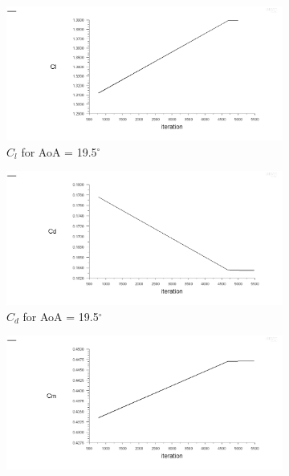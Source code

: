 \begin{figure}[H]
  \begin{subfigure}[b]{0.5\textwidth}
    \includegraphics[width=\textwidth]{19.5_deg/AoA_19_5_cl.png}
    \caption{$C_l$ for AoA = 19.5$^\circ$}
    \label{fig:aoa_19.5_cl}
  \end{subfigure}
  \hfill
  \begin{subfigure}[b]{0.5\textwidth}
    \includegraphics[width=\textwidth]{19.5_deg/AoA_19_5_cd.png}
    \caption{$C_d$ for AoA = 19.5$^\circ$}
    \label{fig:aoa_19.5_cd}
  \end{subfigure}
  \begin{subfigure}[b]{0.5\textwidth}
    \includegraphics[width=\textwidth]{19.5_deg/AoA_19_5_cm.png}

\end{subfigure}
\end{figure}
